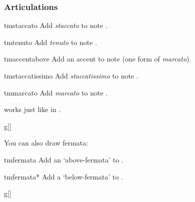 \documentclass[11pt,a4paper]{ltxdoc}
\begin{document}
\subsubsection{Articulations}\label{sec:music-notes:misc:articulations}
\begin{docCommand}{tmstaccato}{}
  Add \emph{staccato} to note .
\end{docCommand}
\begin{docCommand}{tmtenuto}{}
  Add \emph{tenuto} to note .
\end{docCommand}
\begin{docCommand}{tmaccentabove}{}
  Add an accent to note  (one form of \emph{marcato}).
\end{docCommand}
\begin{docCommand}{tmstaccatissimo}{}
  Add \emph{staccatissimo} to note .
\end{docCommand}
\begin{docCommand}{tmmarcato}{}
  Add \emph{marcato} to note .
\end{docCommand}
 works just like in .
\begin{dispExample}
\begin{tmsinglestaff}
  \begin{tmstaff}{g}[]
  \end{tmstaff}
\end{tmsinglestaff}
\end{dispExample}
You can also draw fermata:
\begin{docCommand}{tmfermata}{}
  Add an `above-fermata' to .
\end{docCommand}
\begin{docCommand}{tmfermata*}{}
  Add a `below-fermata' to .
\end{docCommand}
\begin{dispExample}
\begin{tmsinglestaff}
  \begin{tmstaff}{g}[]
  \end{tmstaff}
\end{tmsinglestaff}
\end{dispExample}
\end{document}

